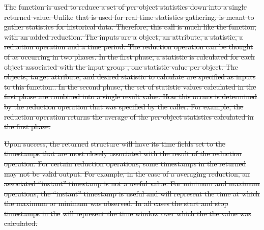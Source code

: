 \documentclass[12pt]{report} %
\providecommand{\DIFdeltex}[1]{{\protect\color{red}\sout{#1}}}                      %
\providecommand{\DIFdel}[1]{\texorpdfstring{\DIFdeltex{#1}}{}} %
\begin{document}
\DIFdel{The }%
\DIFdel{function is used to reduce a set of per-object statistics down into a single returned value.
Unlike }%
\DIFdel{that is used for real time statistics gathering, \textt{PWR_GrpGetReduce} is meant to gather statistics for historical data.
Therefore, this call is much like the \textt{PWR_GrpGetStats} function, with an added reduction.
The inputs are a }%
\DIFdel{object, an attribute, a statistic, a reduction operation and a time period.
The reduction operation can be thought of as occurring in two phases.
In the first phase, a statistic is calculated for each object associated with the input group , one statistic value per object.
The objects, target attribute, and desired statistic to calculate are specified as inputs to this function..
In the second phase, the set of statistic values calculated in the first phase are combined into a single result value.
How this occurs is determined by the reduction operation that was specified by the caller.
For example, the }%
\DIFdel{reduction operation returns the average of the per-object statistics calculated in the first phase.
}%


\DIFdel{Upon success, the returned }%
\DIFdel{structure will have its time fields set to the timestamps that are most closely associated with the result of the reduction operation.
For certain reduction operations, some timestamps in the returned }%
\DIFdel{may not be valid output.
For example, in the case of a averaging reduction, an associated ``instant'' timestamp is not a useful value.
For minimum and maximum operations, the ``instant'' timestamp is useful and will represent the time at which the maximum or minimum was observed.
In all cases the start and stop timestamps in the }%
\DIFdel{will represent the time window over which the the value was calculated. 
}%
\end{document}
